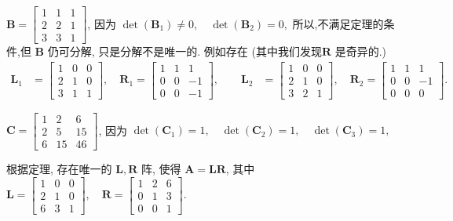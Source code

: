 \begin{tcolorbox}
 $ \boldsymbol{B}=\left[\begin{array}{lll}1 & 1 & 1 \\ 2 & 2 & 1 \\ 3 & 3 & 1\end{array}\right] $, 因为 $\operatorname{det}\left(\boldsymbol{B}_{1}\right) \neq 0, \quad \operatorname{det}\left(\boldsymbol{B}_{2}\right)=0,$
所以,不满足定理的条件,但 $ \boldsymbol{B} $ 仍可分解, 只是分解不是唯一的. 例如存在  (其中我们发现$ \boldsymbol{R} $ 是奇异的.)
$$
\begin{array}{lll}
\boldsymbol{L}_{1} & =\left[\begin{array}{lll}
1 & 0 & 0 \\
2 & 1 & 0 \\
3 & 1 & 1
\end{array}\right],\quad \boldsymbol{R}_{1}=\left[\begin{array}{ccc}
1 & 1 & 1 \\
0 & 0 & -1 \\
0 & 0 & -1
\end{array}\right], \qquad
\boldsymbol{L}_{2} & =\left[\begin{array}{lll}
1 & 0 & 0 \\
2 & 1 & 0 \\
3 & 2 & 1
\end{array}\right], \quad \boldsymbol{R}_{2}=\left[\begin{array}{ccc}
1 & 1 & 1 \\
0 & 0 & -1 \\
0 & 0 & 0
\end{array}\right] .
\end{array}
$$



 $ \boldsymbol{C}=\left[\begin{array}{ccc}1 & 2 & 6 \\ 2 & 5 & 15 \\ 6 & 15 & 46\end{array}\right] $, 因为
$
\operatorname{det}\left(\boldsymbol{C}_{1}\right)=1, \quad \operatorname{det}\left(\boldsymbol{C}_{2}\right)=1, \quad \operatorname{det}\left(\boldsymbol{C}_{3}\right)=1,
$

根据定理, 存在唯一的 $ \boldsymbol{L}, \boldsymbol{R} $ 阵, 使得 $ \boldsymbol{A}=\boldsymbol{L R} $, 其中
$
\boldsymbol{L}=\left[\begin{array}{lll}
1 & 0 & 0 \\
2 & 1 & 0 \\
6 & 3 & 1
\end{array}\right], \quad \boldsymbol{R}=\left[\begin{array}{lll}
1 & 2 & 6 \\
0 & 1 & 3 \\
0 & 0 & 1
\end{array}\right] .
$




\end{tcolorbox}


